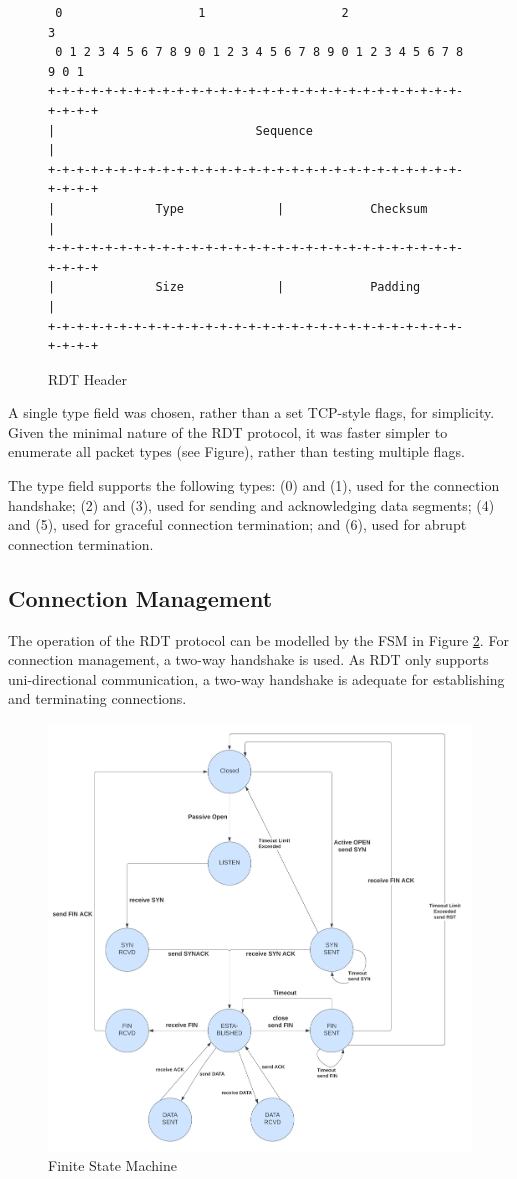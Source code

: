 \begin{figure}
\begin{center}
\begin{verbatim}
 0                   1                   2                   3  
 0 1 2 3 4 5 6 7 8 9 0 1 2 3 4 5 6 7 8 9 0 1 2 3 4 5 6 7 8 9 0 1
+-+-+-+-+-+-+-+-+-+-+-+-+-+-+-+-+-+-+-+-+-+-+-+-+-+-+-+-+-+-+-+-+
|                            Sequence                           |
+-+-+-+-+-+-+-+-+-+-+-+-+-+-+-+-+-+-+-+-+-+-+-+-+-+-+-+-+-+-+-+-+
|              Type             |            Checksum           |
+-+-+-+-+-+-+-+-+-+-+-+-+-+-+-+-+-+-+-+-+-+-+-+-+-+-+-+-+-+-+-+-+
|              Size             |            Padding            |
+-+-+-+-+-+-+-+-+-+-+-+-+-+-+-+-+-+-+-+-+-+-+-+-+-+-+-+-+-+-+-+-+
\end{verbatim}
\end{center}
\caption{RDT Header}\label{fig:header}
\end{figure}

A single type field was chosen, rather than a set TCP-style flags, for simplicity. Given the minimal nature of the RDT protocol, it was faster simpler to enumerate all packet types (see Figure), rather than testing multiple flags.

The type field supports the following types:  (0) and  (1), used for the connection handshake;  (2) and  (3), used for sending and acknowledging data segments;  (4) and  (5), used for graceful connection termination; and  (6), used for abrupt connection termination.

\subsection{Connection Management}

The operation of the RDT protocol can be modelled by the FSM in Figure \ref{fig:fsm}. For connection management, a two-way handshake is used. As RDT only supports uni-directional communication, a two-way handshake is adequate for establishing and terminating connections.

\begin{figure}[H]
\begin{center}
    \includegraphics[width=120mm]{images/fsm.png}
\end{center}
\caption{Finite State Machine}\label{fig:fsm}
\end{figure}